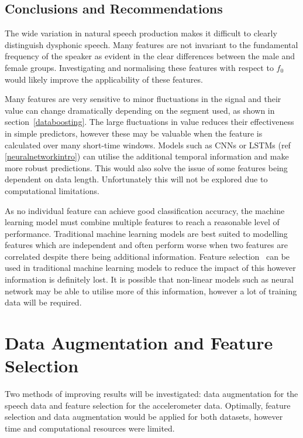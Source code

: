\documentclass[12pt, twoside]{book}
\begin{document}
\subsection{Conclusions and Recommendations}
\label{visfeatrecommendations}
The wide variation in natural speech production makes it difficult to clearly distinguish dysphonic speech. Many features are not invariant to the fundamental frequency of the speaker as evident in the clear differences between the male and female groups. Investigating and normalising these features with respect to $f_0$ would likely improve the applicability of these features.

Many features are very sensitive to minor fluctuations in the signal and their value can change dramatically depending on the segment used, as shown in section~\ref{databoosting}. The large fluctuations in value reduces their effectiveness in simple predictors, however these may be valuable when the feature is calculated over many short-time windows. Models such as CNNs or LSTMs (ref \ref{neuralnetworkintro}) can utilise the additional temporal information and make more robust predictions. This would also solve the issue of some features being dependent on data length. Unfortunately this will not be explored due to computational limitations.

As no individual feature can achieve good classification accuracy, the machine learning model must combine multiple features to reach a reasonable level of performance. Traditional machine learning models are best suited to modelling features which are independent and often perform worse when two features are correlated despite there being additional information. Feature selection~\cite{skfeature} can be used in traditional machine learning models to reduce the impact of this however information is definitely lost. It is possible that non-linear models such as neural network may be able to utilise more of this information, however a lot of training data will be required.

\section{Data Augmentation and Feature Selection}

Two methods of improving results will be investigated: data augmentation for the speech data and feature selection for the accelerometer data. Optimally, feature selection and data augmentation would be applied for both datasets, however time and computational resources were limited.
\end{document}

